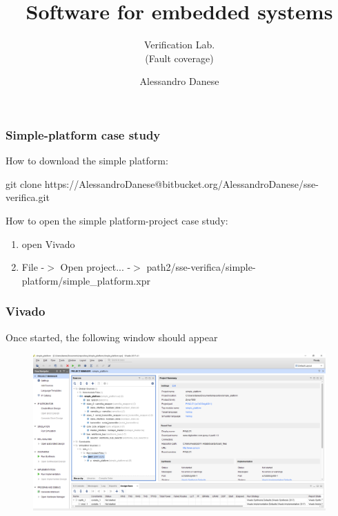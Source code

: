 \documentclass{beamer}
\title[About Beamer] %
{Software for embedded systems}
\subtitle{Verification Lab.\\ (Fault coverage)}
\author{Alessandro Danese}
\institute{University of Verona, Verona, Italy
\\alessandro.danese@univr.it}
\begin{document}
 
\frame{\titlepage}
 
 
\begin{frame}
\frametitle{Simple-platform case study}

How to download the simple platform:
\begin{block}{}
	git clone https://AlessandroDanese@bitbucket.org/AlessandroDanese/sse-verifica.git
\end{block}

How to open the simple platform-project case study:
\begin{block}{}
	\begin{enumerate}
		\item 
		open Vivado
		\item
		File -$>$ Open project... -$>$ path2/sse-verifica/simple-platform/simple\_platform.xpr
	\end{enumerate}
\end{block}

\end{frame}

\begin{frame}
\frametitle{Vivado}
Once started, the following window should appear

\begin{figure}
\centering
\includegraphics[width=0.9\columnwidth]{figures/vivado_sp.png}
\end{figure}

\end{frame}
\end{document}
